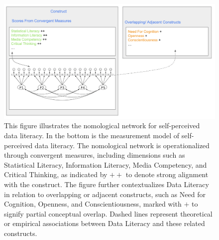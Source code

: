 \documentclass[
  12pt,
  a4paper,
  twoside]{article}
\begin{document}
\begin{figure}

{\centering \includegraphics[width=1\linewidth]{images/DL_NomNet} 

}

\caption{\footnotesize{This figure illustrates the nomological network for self-perceived data literacy. In the bottom is the measurement model of self-perceived data literacy. The nomological network is operationalized through convergent measures, including dimensions such as Statistical Literacy, Information Literacy, Media Competency, and Critical Thinking, as indicated by $++$ to denote strong alignment with the construct. The figure further contextualizes Data Literacy in relation to overlapping or adjacent constructs, such as Need for Cognition, Openness, and Conscientiousness, marked with $+$ to signify partial conceptual overlap. Dashed lines represent theoretical or empirical associations between Data Literacy and these related constructs.}}\label{fig:nomnet}
\end{figure}
\end{document}
